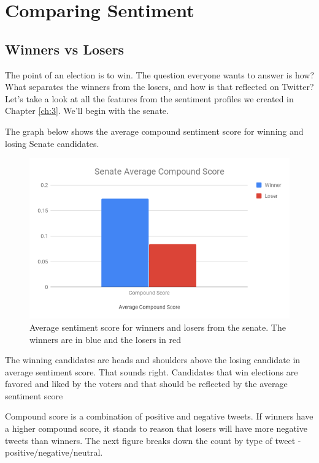 \documentclass[11pt, twoside, reqno]{book}
\begin{document}
\section{Comparing Sentiment}

\subsection{Winners vs Losers}
\hspace{0.2in}The point of an election is to win. The question everyone wants to answer is how? What separates the winners from the losers, and how is that reflected on Twitter? Let's take a look at all the features from the sentiment profiles we created in Chapter \ref{ch:3}. We'll begin with the senate. 

The graph below shows the average compound sentiment score for winning and losing Senate candidates.
\begin{figure}[H]
\centering
	\includegraphics[scale=0.5]{sen_ave_score}
	\caption{Average sentiment score for winners and losers from the senate. The winners are in blue and the losers in red}\label{fig:sen_ave_score}
\end{figure}
The winning candidates are heads and shoulders above the losing candidate in average sentiment score. That sounds right. Candidates that win elections are favored and liked by the voters and that should be reflected by the average sentiment score

Compound score is a combination of positive and negative tweets. If winners have a higher compound score, it stands to reason that losers will have more negative tweets than winners. The next figure breaks down the count by type of tweet - positive/negative/neutral. 
\end{document}

